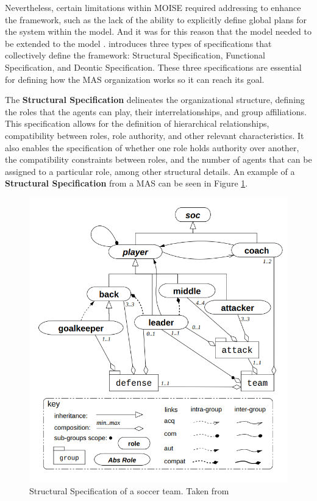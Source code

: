 Nevertheless, certain limitations within MOISE required addressing to enhance the framework, such as the lack of the ability to explicitly define global plans for the system within the model. And it was for this reason that the model needed to be extended to the \MOISEp model \cite{MOISEp}. \MOISEp introduces three types of specifications that collectively define the framework: Structural Specification, Functional Specification, and Deontic Specification. These three specifications are essential for defining how the MAS organization works so it can reach its goal.

The \textbf{Structural Specification} delineates the organizational structure, defining the roles that the agents can play, their interrelationships, and group affiliations. This specification allows for the definition of hierarchical relationships, compatibility between roles, role authority, and other relevant characteristics. It also enables the specification of whether one role holds authority over another, the compatibility constraints between roles, and the number of agents that can be assigned to a particular role, among other structural details. An example of a \textbf{Structural Specification} from a MAS can be seen in Figure \ref{fig:moise_ss}.

\begin{figure}
    \centering
    \includegraphics[width=0.75\linewidth]{chapters/background/images/MOISE - SS.png}
    \caption{Structural Specification of a soccer team. Taken from \cite{MOISEp}}
    \label{fig:moise_ss}
\end{figure}

